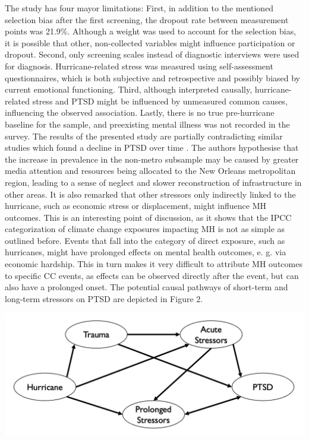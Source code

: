\documentclass[
]{krantz}
\begin{document}
The study has four mayor limitations: First, in addition to the mentioned selection bias after the first screening, the dropout rate between measurement points was 21.9\%. Although a weight was used to account for the selection bias, it is possible that other, non-collected variables might influence participation or dropout. Second, only screening scales instead of diagnostic interviews were used for diagnosis. Hurricane-related stress was measured using self-assessment questionnaires, which is both subjective and retrospective and possibly biased by current emotional functioning. Third, although interpreted causally, hurricane-related stress and PTSD might be influenced by unmeasured common causes, influencing the observed association. Lastly, there is no true pre-hurricane baseline for the sample, and preexisting mental illness was not recorded in the survey.
The results of the presented study are partially contradicting similar studies which found a decline in PTSD over time \citep{chenIncidencePosttraumaticStress2015}. The authors hypothesise that the increase in prevalence in the non-metro subsample may be caused by greater media attention and resources being allocated to the New Orleans metropolitan region, leading to a sense of neglect and slower reconstruction of infrastructure in other areas. It is also remarked that other stressors only indirectly linked to the hurricane, such as economic stress or displacement, might influence MH outcomes. This is an interesting point of discussion, as it shows that the IPCC categorization of climate change exposures impacting MH is not as simple as outlined before. Events that fall into the category of direct exposure, such as hurricanes, might have prolonged effects on mental health outcomes, e. g. via economic hardship. This in turn makes it very difficult to attribute MH outcomes to specific CC events, as effects can be observed directly after the event, but can also have a prolonged onset. The potential causal pathways of short-term and long-term stressors on PTSD are depicted in Figure 2.

\begin{center}\includegraphics[width=0.75\linewidth]{work/12-mentalhealth/figures/DAG_hurricane} \end{center}
\end{document}
